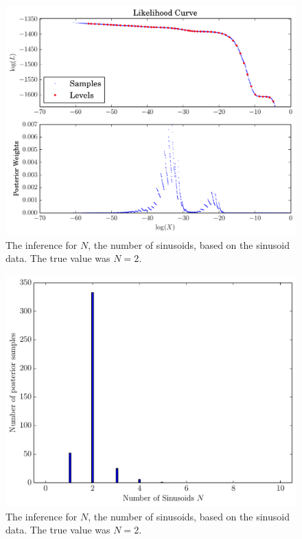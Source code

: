 \documentclass[letterpaper, 11pt]{article}
\begin{document}
\begin{figure}
\begin{center}
\includegraphics[scale=0.5]{sinewaves_likelihood.pdf}
\caption{The inference for $N$, the number of sinusoids, based on the
sinusoid data. The true value was $N=2$.
\label{fig:sinewaves_likelihood}}
\end{center}
\end{figure}


\begin{figure}
\begin{center}
\includegraphics[scale=0.5]{N_result.pdf}
\caption{The inference for $N$, the number of sinusoids, based on the
sinusoid data. The true value was $N=2$.
\label{fig:N_result}}
\end{center}
\end{figure}
\end{document}
